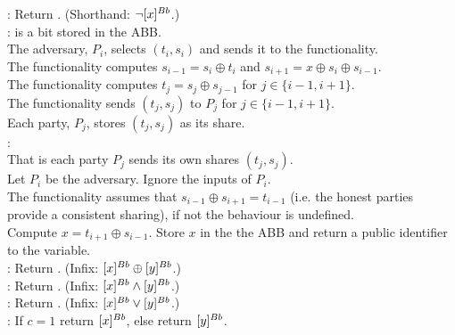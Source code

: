 \begin{functionality}
	: Return . (Shorthand: $\neg [x]^{Bb}$.) \\

    :  is a bit stored in the ABB. \\
	The adversary, $P_i$, selects $(t_i, s_i)$ and sends it to the functionality.\\
	The functionality computes $s_{i-1} = s_i \oplus t_i$
	and $s_{i+1} = x \oplus s_{i} \oplus s_{i-1}$.\\
	The functionality computes $t_j = s_j \oplus s_{j-1}$ for $j \in \{i-1, i+1\}$.\\
	The functionality sends $(t_j, s_j)$ to $P_j$ for $j \in \{i-1, i+1\}$.\\
	Each party, $P_j$, stores $(t_j, s_j)$ as its share.\\

	:\\
	That is each party $P_j$ sends its own shares $(t_j, s_j)$.\\
	Let $P_i$ be the adversary. Ignore the inputs of $P_i$.\\
	The functionality assumes that $s_{i-1} \oplus s_{i+1} = t_{i-1}$ 
	(i.e. the honest parties provide a consistent sharing),
	if not the behaviour is undefined.\\
	Compute $x = t_{i+1} \oplus s_{i-1}$. 
	Store $x$ in the the ABB and return a public identifier to the variable. \\

    : Return .  (Infix: $[x]^{Bb} \oplus [y]^{Bb}$.)  \\ 

    : Return . (Infix: $[x]^{Bb} \wedge [y]^{Bb}$.)  \\

    : Return . (Infix: $[x]^{Bb} \vee [y]^{Bb}$.) \\
    
    : If $c=1$ return $[x]^{Bb}$, else return $[y]^{Bb}$.

\end{functionality}
